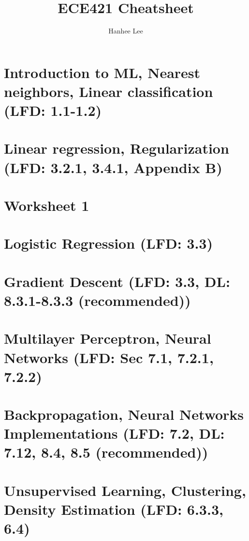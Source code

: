 \documentclass{article}
\title{ECE421 Cheatsheet}
\author{Hanhee Lee}
\begin{document}
\maketitle

\tableofcontents

\listoffigures

\listoftables

\section{Introduction to ML, Nearest neighbors, Linear classification (LFD: 1.1-1.2)}

\newpage

\section{Linear regression, Regularization (LFD: 3.2.1, 3.4.1, Appendix B)}

\newpage

\section{Worksheet 1}

\newpage

\section{Logistic Regression (LFD: 3.3)}

\newpage

\section{Gradient Descent (LFD: 3.3, DL: 8.3.1-8.3.3 (recommended))}

\newpage

\section{Multilayer Perceptron, Neural Networks (LFD: Sec 7.1, 7.2.1, 7.2.2)}

\newpage

\section{Backpropagation, Neural Networks Implementations (LFD: 7.2, DL: 7.12, 8.4, 8.5 (recommended))}

\newpage

\section{Unsupervised Learning, Clustering, Density Estimation (LFD: 6.3.3, 6.4)}

\newpage
\end{document}
